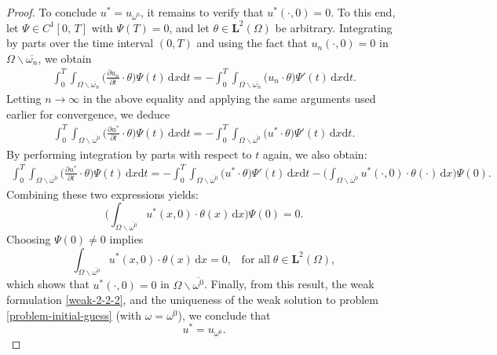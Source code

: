 \documentclass[a4paper,12pt,reqno,natbib]{amsart}
\newcommand{\dx} {\displaystyle\mathrm{d}x}
\newcommand{\dt} {\displaystyle\mathrm{d}t}
\def\L{\textbf{L}}
\begin{document}
\begin{proof}
\noindent To conclude $u^*=u_{\omega^0}$, it remains to verify that $u^*(\cdot,0)=0$. To this end, let $\Psi\in C^1[0,\, T]$ with $\Psi(T) = 0$, and let $\theta\in \L^2(\Omega)$ be arbitrary. Integrating by parts over the time interval $(0,T)$ and using the fact that $u_n(\cdot,0)=0$ in $\Omega\backslash\overline{\omega_n}$, we obtain
\begin{align}
   \int_{0}^{T} \int_{\Omega\backslash\overline{\omega_n}} \big(\frac{\partial u_n}{\partial t}\cdot \theta\big)\Psi(t)\, \dx\dt=-\int_{0}^{T} \int_{\Omega\backslash\overline{\omega_n}}  \big(u_n \cdot\theta\big)\Psi'(t)\, \dx\dt.
\end{align}
Letting $n \rightarrow \infty$ in the above equality and applying the same arguments used earlier for convergence, we deduce
\begin{align}
   \int_{0}^{T} \int_{\Omega\backslash\overline{\omega^0}} \big(\frac{\partial u^*}{\partial t}\cdot\theta\big) \Psi(t)\, \dx\dt=-\int_{0}^{T} \int_{\Omega\backslash\overline{\omega^0}}  \big(u^* \cdot\theta\big)\Psi'(t)\, \dx\dt.
\end{align}
By performing integration by parts with respect to $t$ again, we also obtain:\begin{align*}
   \int_{0}^{T} \int_{\Omega\backslash\overline{\omega^0}} \big(\frac{\partial u^*}{\partial t}\cdot\theta\big) \Psi(t)\, \dx\dt=-\int_{0}^{T} \int_{\Omega\backslash\overline{\omega^0}}  \big(u^* \cdot\theta\big)\Psi'(t)\, \dx\dt-\big(\int_{\Omega\backslash\overline{\omega^0}} u^*(\cdot,0)\cdot\theta(\cdot)\, \dx\big)\Psi(0).
\end{align*}
Combining these two expressions yields:
\begin{equation*}
    \big(\int_{\Omega\backslash\overline{\omega^0}} u^*(x,0)\cdot\theta(x)\, \dx\big)\Psi(0)=0.
\end{equation*}
Choosing $\Psi(0)\not=0$ implies
\begin{equation}\label{initial-u0}
    \int_{\Omega\backslash\overline{\omega^0}} u^*(x,0)\cdot\theta(x)\, \dx=0,\;\;\;\text{for all}\;\theta\in\L^2(\Omega),
\end{equation}
which shows that $u^*(\cdot,0)=0$ in $\Omega\backslash\overline{\omega^0}$. Finally, from this result, the weak formulation \eqref{weak-2-2-2}, and the uniqueness of the weak solution to problem \eqref{problem-initial-guess}  (with $\omega=\omega^0$), we conclude that
\begin{equation}\label{uw-0}
    u^*=u_{\omega^0}.
\end{equation}




\end{proof}
\end{document}
